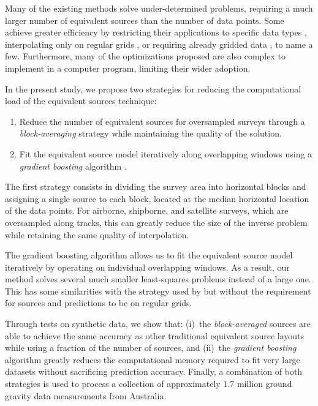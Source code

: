 Many of the existing methods solve under-determined problems, requiring a much
larger number of equivalent sources than the number of data points.
Some achieve greater efficiency by restricting their applications
to specific data types \citep{siqueira2017},
interpolating only on regular grids \citep{leao1989},
or requiring already gridded data \citep{takahashi2020},
to name a few.
Furthermore, many of the optimizations proposed are also complex to implement
in a computer program, limiting their wider adoption.

In the present study,
we propose two strategies for reducing the computational load of
the equivalent sources technique:

\begin{enumerate}
    \item Reduce the number of equivalent sources for oversampled surveys
      through a \emph{block-averaging} strategy while maintaining the quality
      of the solution.
    \item Fit the equivalent source model iteratively along overlapping windows
      using a \emph{gradient boosting} algorithm \citep{friedman2001}.
\end{enumerate}

The first strategy consists in dividing the survey area into horizontal blocks
and assigning a single source to each block, located at the median horizontal
location of the data points.
For airborne, shipborne, and satellite surveys, which are oversampled along
tracks, this can greatly reduce the size of the inverse problem while retaining
the same quality of interpolation.

The gradient boosting algorithm allows us to fit the equivalent source model
iteratively by operating on individual overlapping windows.
As a result, our method solves several much smaller least-squares problems
instead of a large one.
This has some similarities with the strategy used by \citet{leao1989} but
without the requirement for sources and predictions to be on regular grids.

Through tests on synthetic data, we show that:
(i)~the \emph{block-averaged} sources are able to achieve the same accuracy as
other traditional equivalent source layouts while using a fraction of the
number of sources, and
(ii)~the \emph{gradient boosting} algorithm greatly reduces the computational
memory required to fit very large datasets without sacrificing prediction
accuracy.
Finally, a combination of both strategies is used to process a collection of
approximately 1.7 million ground gravity data measurements from Australia.

